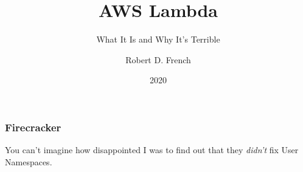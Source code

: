 \documentclass{beamer}
\title{AWS Lambda}
\subtitle{What It Is and Why It's Terrible}
\author{Robert D. French}
\institute{Old Man Yells at Cloud, Inc.}
\date{2020}
\begin{document}
 
\frame{\titlepage}
 
\begin{frame}
	\frametitle{Firecracker}
	You can't imagine how disappointed I was to find out that they \emph{didn't} fix
	User Namespaces.
\end{frame}
 
\end{document}
